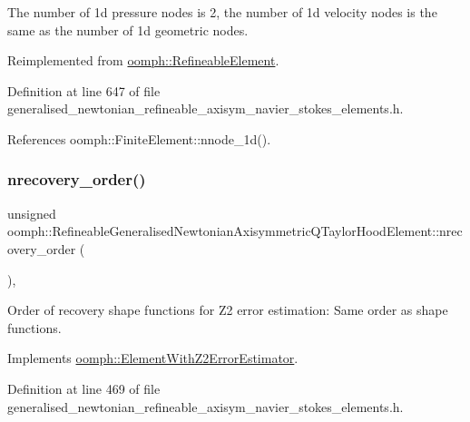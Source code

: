 The number of 1d pressure nodes is 2, the number of 1d velocity nodes is the same as the number of 1d geometric nodes. 



Reimplemented from \hyperlink{classoomph_1_1RefineableElement_a850180084aaf164550b4f4978b42cda7}{oomph\+::\+Refineable\+Element}.



Definition at line 647 of file generalised\+\_\+newtonian\+\_\+refineable\+\_\+axisym\+\_\+navier\+\_\+stokes\+\_\+elements.\+h.



References oomph\+::\+Finite\+Element\+::nnode\+\_\+1d().

\mbox{\label{classoomph_1_1RefineableGeneralisedNewtonianAxisymmetricQTaylorHoodElement_af121fcf019006367505c47ba8c071c8e}} 
\subsubsection{\texorpdfstring{nrecovery\+\_\+order()}{nrecovery\_order()}}
{\footnotesize\ttfamily unsigned oomph\+::\+Refineable\+Generalised\+Newtonian\+Axisymmetric\+Q\+Taylor\+Hood\+Element\+::nrecovery\+\_\+order (\begin{DoxyParamCaption}{ }\end{DoxyParamCaption})\hspace{0.3cm}{\ttfamily [inline]}, {\ttfamily [virtual]}}



Order of recovery shape functions for Z2 error estimation\+: Same order as shape functions. 



Implements \hyperlink{classoomph_1_1ElementWithZ2ErrorEstimator_af39480835bd3e0f6b2f4f7a9a4044798}{oomph\+::\+Element\+With\+Z2\+Error\+Estimator}.



Definition at line 469 of file generalised\+\_\+newtonian\+\_\+refineable\+\_\+axisym\+\_\+navier\+\_\+stokes\+\_\+elements.\+h.

